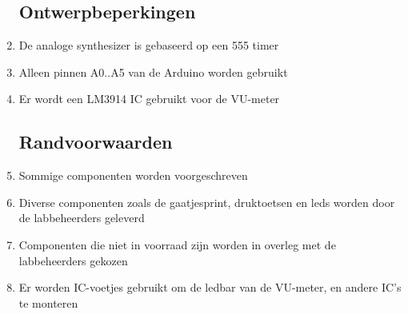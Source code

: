 \documentclass[12pt, a4paper, dutch]{article}
\begin{document}
\begin{enumerate}
\subsection{Ontwerpbeperkingen}
	\item \label{req:555} De analoge synthesizer is gebaseerd op een 555 timer
	\item \label{req:a05} Alleen pinnen A0..A5 van de Arduino worden gebruikt
	\item \label{req:lm3914} Er wordt een LM3914 IC gebruikt voor de VU-meter
\subsection{Randvoorwaarden}
	\item Sommige componenten worden voorgeschreven
	\item Diverse componenten zoals de gaatjesprint, druktoetsen en leds worden door de
		labbeheerders geleverd
	\item Componenten die niet in voorraad zijn worden in overleg met de labbeheerders
		gekozen
	\item Er worden IC-voetjes gebruikt om de ledbar van de VU-meter, en andere IC's te
		monteren
\end{enumerate}
\end{document}
